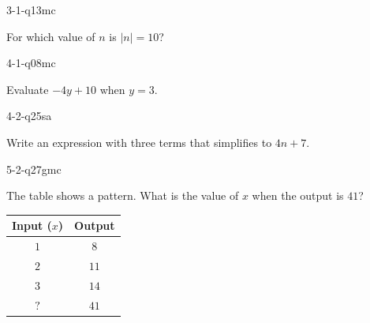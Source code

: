\begin{practiceQuestion}{3-1-q13}{mc}
\begin{questionText}
For which value of $n$ is $|n| = 10$?
\end{questionText}
\end{practiceQuestion}

\begin{practiceQuestion}{4-1-q08}{mc}
\begin{questionText}
Evaluate $-4y + 10$ when $y = 3$.
\end{questionText}
\end{practiceQuestion}

\begin{practiceQuestion}{4-2-q25}{sa}
\begin{questionText}
Write an expression with three terms that simplifies to $4n + 7$.
\end{questionText}
\end{practiceQuestion}

\begin{practiceQuestion}{5-2-q27}{gmc}
\begin{questionText}
The table shows a pattern. What is the value of $x$ when the output is $41$?

\begin{center}
\begin{tabular}{|c|c|}
\hline
\textbf{Input ($x$)} & \textbf{Output} \\
\hline
$1$ & $8$ \\
\hline
$2$ & $11$ \\
\hline
$3$ & $14$ \\
\hline
$?$ & $41$ \\
\hline
\end{tabular}
\end{center}
\end{questionText}
\end{practiceQuestion}

